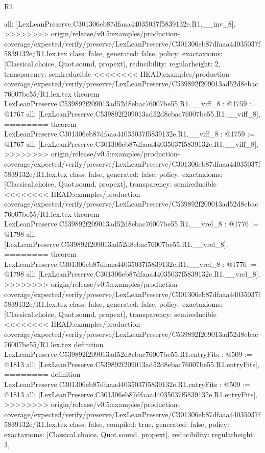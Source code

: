 \begin{lexlean}{R1}
\begin{coremodule}
{{{{{{{{{{{{  all: [LexLeanPreserve.C301306eb87dfaaa44035037f5839132e.R1.__inv_8],
>>>>>>>> origin/release/v0.5:examples/production-coverage/expected/verify/preserve/LexLeanPreserve/C301306eb87dfaaa44035037f5839132e/R1.lex.tex
  class: false,
  generated: false,
  policy: exact{axioms: [Classical.choice, Quot.sound, propext]},
  reducibility: regular{height: 2},
  transparency: semireducible
}
<<<<<<<< HEAD:examples/production-coverage/expected/verify/preserve/LexLeanPreserve/C539892f209013ad52d8ebac76007be55/R1.lex.tex
theorem LexLeanPreserve.C539892f209013ad52d8ebac76007be55.R1.__viff_8 : @1759 := @1767 {
  all: [LexLeanPreserve.C539892f209013ad52d8ebac76007be55.R1.__viff_8],
========
theorem LexLeanPreserve.C301306eb87dfaaa44035037f5839132e.R1.__viff_8 : @1759 := @1767 {
  all: [LexLeanPreserve.C301306eb87dfaaa44035037f5839132e.R1.__viff_8],
>>>>>>>> origin/release/v0.5:examples/production-coverage/expected/verify/preserve/LexLeanPreserve/C301306eb87dfaaa44035037f5839132e/R1.lex.tex
  class: false,
  generated: false,
  policy: exact{axioms: [Classical.choice, Quot.sound, propext]},
  transparency: semireducible
}
<<<<<<<< HEAD:examples/production-coverage/expected/verify/preserve/LexLeanPreserve/C539892f209013ad52d8ebac76007be55/R1.lex.tex
theorem LexLeanPreserve.C539892f209013ad52d8ebac76007be55.R1.__vrel_8 : @1776 := @1798 {
  all: [LexLeanPreserve.C539892f209013ad52d8ebac76007be55.R1.__vrel_8],
========
theorem LexLeanPreserve.C301306eb87dfaaa44035037f5839132e.R1.__vrel_8 : @1776 := @1798 {
  all: [LexLeanPreserve.C301306eb87dfaaa44035037f5839132e.R1.__vrel_8],
>>>>>>>> origin/release/v0.5:examples/production-coverage/expected/verify/preserve/LexLeanPreserve/C301306eb87dfaaa44035037f5839132e/R1.lex.tex
  class: false,
  generated: false,
  policy: exact{axioms: [Classical.choice, Quot.sound, propext]},
  transparency: semireducible
}
<<<<<<<< HEAD:examples/production-coverage/expected/verify/preserve/LexLeanPreserve/C539892f209013ad52d8ebac76007be55/R1.lex.tex
definition LexLeanPreserve.C539892f209013ad52d8ebac76007be55.R1.entryFits : @509 := @1813 {
  all: [LexLeanPreserve.C539892f209013ad52d8ebac76007be55.R1.entryFits],
========
definition LexLeanPreserve.C301306eb87dfaaa44035037f5839132e.R1.entryFits : @509 := @1813 {
  all: [LexLeanPreserve.C301306eb87dfaaa44035037f5839132e.R1.entryFits],
>>>>>>>> origin/release/v0.5:examples/production-coverage/expected/verify/preserve/LexLeanPreserve/C301306eb87dfaaa44035037f5839132e/R1.lex.tex
  class: false,
  compiled: true,
  generated: false,
  policy: exact{axioms: [Classical.choice, Quot.sound, propext]},
  reducibility: regular{height: 3},
}}}}}}}}}}}}}}}
\end{coremodule}
\end{lexlean}
